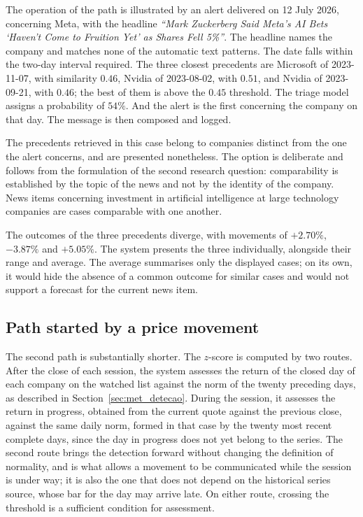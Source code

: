 The operation of the path is illustrated by an alert delivered on 12 July 2026, concerning Meta,
with the headline \emph{``Mark Zuckerberg Said Meta's AI Bets `Haven't Come to Fruition Yet' as
Shares Fell 5\%''}. The headline names the company and matches none of the automatic text patterns.
The date falls within the two-day interval required. The three closest precedents are Microsoft of
2023-11-07, with similarity $0.46$, Nvidia of 2023-08-02, with $0.51$, and Nvidia of 2023-09-21,
with $0.46$; the best of them is above the $0.45$ threshold. The triage model assigns a probability
of $54\%$. And the alert is the first concerning the company on that day. The message is then
composed and logged.

The precedents retrieved in this case belong to companies distinct from the one the alert concerns,
and are presented nonetheless. The option is deliberate and follows from the formulation of the
second research question: comparability is established by the topic of the news and not by the
identity of the company. News items concerning investment in artificial intelligence at large
technology companies are cases comparable with one another.

The outcomes of the three precedents diverge, with movements of $+2.70\%$, $-3.87\%$ and
$+5.05\%$. The system presents the three individually, alongside their range and average.
The average summarises only the displayed cases; on its own, it would hide the absence of a
common outcome for similar cases and would not support a forecast for the current news item.

\subsection{Path started by a price movement}

The second path is substantially shorter. The $z$-score is computed by two routes. After the close
of each session, the system assesses the return of the closed day of each company on the watched
list against the norm of the twenty preceding days, as described in Section~\ref{sec:met_detecao}.
During the session, it assesses the return in progress, obtained from the current quote against the
previous close, against the same daily norm, formed in that case by the twenty most recent complete
days, since the day in progress does not yet belong to the series. The second route brings the
detection forward without changing the definition of normality, and is what allows a movement to be
communicated while the session is under way; it is also the one that does not depend on the
historical series source, whose bar for the day may arrive late. On either route, crossing the
threshold is a sufficient condition for assessment.

